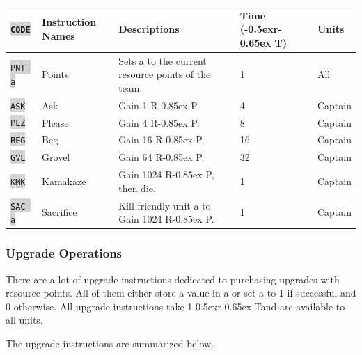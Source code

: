 \documentclass{article}
\newcommand{\vnscode}[1]{\colorbox{lightgray}{\lstinline[language=vns]{#1}}}
\newcommand{\RT}{\lower-0.5ex\hbox{r}\kern-0.65ex T}
\newcommand{\RP}{R\kern-0.85ex P}
\begin{document}
\begin{minipage}{\textwidth}
\label{table:resource}
\centering
\begin{tabular}{lllll}
    \hline \vnscode{CODE} & Instruction Names & Descriptions & Time (\RT) & Units \\ \hline
    \vnscode{PNT a} & Points & Sets a to the current resource points of the team. & 1 & All \\
    \vnscode{ASK} & Ask & Gain 1 \RP. & 4 & Captain \\
    \vnscode{PLZ} & Please & Gain 4 \RP. & 8 & Captain \\
    \vnscode{BEG} & Beg & Gain 16 \RP. & 16 & Captain \\
    \vnscode{GVL} & Grovel & Gain 64 \RP. & 32 & Captain \\
    \vnscode{KMK} & Kamakaze & Gain 1024 \RP, then die. & 1 & Captain \\
    \vnscode{SAC a} & Sacrifice & Kill friendly unit a to Gain 1024 \RP. & 1 & Captain \\
\end{tabular}
\end{minipage}

\subsubsection{Upgrade Operations}

There are a lot of upgrade instructions dedicated to purchasing upgrades with
resource points. All of them either store a value in a or set a to 1 if
successful and 0 otherwise. All upgrade instructions take 1\RT and are available
to all units.

The upgrade instructions are summarized below.
\end{document}

